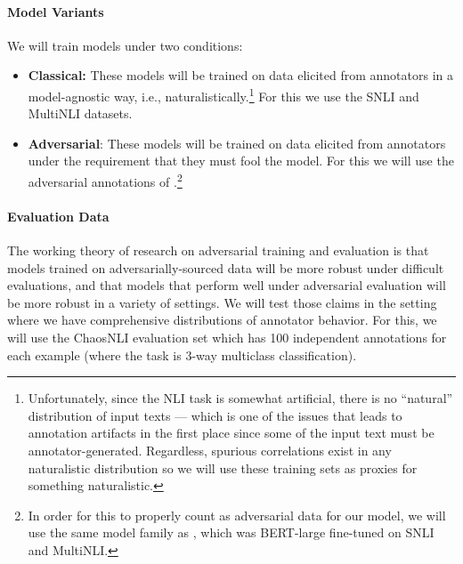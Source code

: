 \documentclass[10pt,a4paper]{article}
\newcommand{\ie}{i.e.}
\begin{document}
\paragraph{Model Variants}
We will train models under two conditions:
\begin{itemize}
    \item \textbf{Classical:} These models will be trained on data elicited from annotators in a model-agnostic way, \ie, naturalistically.\footnote{Unfortunately, since the NLI task is somewhat artificial, there is no ``natural'' distribution of input texts --- which is one of the issues that leads to annotation artifacts in the first place \citep{gururangan2018annotation} since some of the input text must be annotator-generated. Regardless, spurious correlations exist in any naturalistic distribution so we will use these training sets as proxies for something naturalistic.} For this we use the SNLI \citep{bowman2015large} and MultiNLI \citep{williams-etal-2018-broad} datasets.
    \item \textbf{Adversarial}: These models will be trained on data elicited from annotators under the requirement that they must fool the model. For this we will use the adversarial annotations of \citet{nie-etal-2020-adversarial}.\footnote{In order for this to properly count as adversarial data for our model, we will use the same model family as \citet{nie-etal-2020-adversarial}, which was BERT-large \citep{devlin2019bert} fine-tuned on SNLI and MultiNLI.}
\end{itemize}

\paragraph{Evaluation Data}
The working theory of research on adversarial training and evaluation is that models trained on adversarially-sourced data will be more robust under difficult evaluations, and that models that perform well under adversarial evaluation will be more robust in a variety of settings. We will test those claims in the setting where we have comprehensive distributions of annotator behavior. For this, we will use the ChaosNLI evaluation set \citep{nie-bansal-2020-learn} which has 100 independent annotations for each example (where the task is 3-way multiclass classification).
\end{document}
